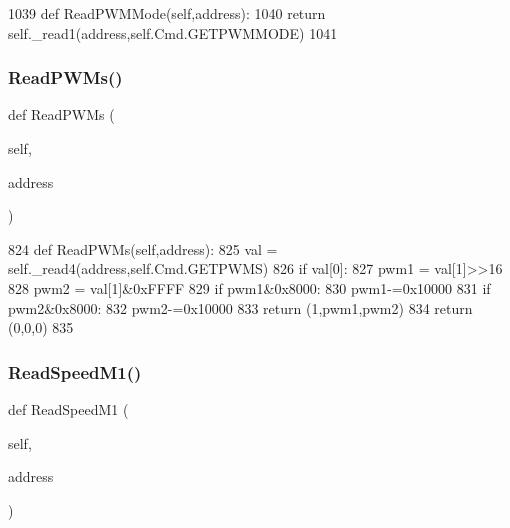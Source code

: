 \begin{DoxyCode}
1039     \textcolor{keyword}{def }ReadPWMMode(self,address):
1040         \textcolor{keywordflow}{return} self.\_read1(address,self.Cmd.GETPWMMODE)
1041 
\end{DoxyCode}
\mbox{\label{classtoxic__hardware_1_1roboclaw__3_1_1Roboclaw_ad6694602dd7294a517f29dfcbf0a3068}} 
\subsubsection{\texorpdfstring{Read\+P\+W\+Ms()}{ReadPWMs()}}
{\footnotesize\ttfamily def Read\+P\+W\+Ms (\begin{DoxyParamCaption}\item[{}]{self,  }\item[{}]{address }\end{DoxyParamCaption})}


\begin{DoxyCode}
824     \textcolor{keyword}{def }ReadPWMs(self,address):
825         val = self.\_read4(address,self.Cmd.GETPWMS)
826         \textcolor{keywordflow}{if} val[0]:
827             pwm1 = val[1]>>16
828             pwm2 = val[1]&0xFFFF
829             \textcolor{keywordflow}{if} pwm1&0x8000:
830                 pwm1-=0x10000
831             \textcolor{keywordflow}{if} pwm2&0x8000:
832                 pwm2-=0x10000
833             \textcolor{keywordflow}{return} (1,pwm1,pwm2)
834         \textcolor{keywordflow}{return} (0,0,0)
835 
\end{DoxyCode}
\mbox{\label{classtoxic__hardware_1_1roboclaw__3_1_1Roboclaw_a4f1e923998c2561bbb86a04bc32df602}} 
\subsubsection{\texorpdfstring{Read\+Speed\+M1()}{ReadSpeedM1()}}
{\footnotesize\ttfamily def Read\+Speed\+M1 (\begin{DoxyParamCaption}\item[{}]{self,  }\item[{}]{address }\end{DoxyParamCaption})}


